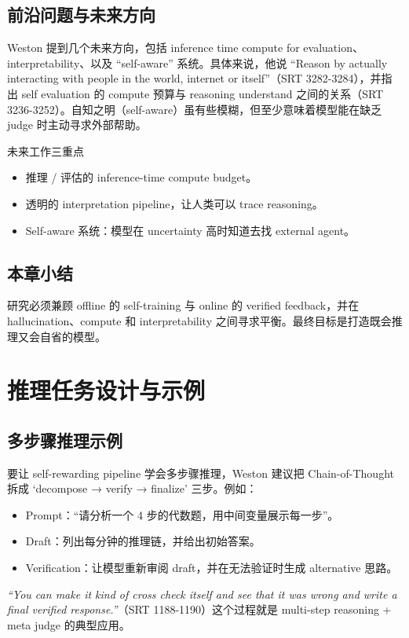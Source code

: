 \documentclass[a4paper]{article}
\begin{document}
\subsection{前沿问题与未来方向}
Weston 提到几个未来方向，包括 inference time compute for evaluation、interpretability、以及 ``self-aware'' 系统。具体来说，他说 ``Reason by actually interacting with people in the world, internet or itself''（SRT 3282-3284），并指出 self evaluation 的 compute 预算与 reasoning understand 之间的关系（SRT 3236-3252）。自知之明（self-aware）虽有些模糊，但至少意味着模型能在缺乏 judge 时主动寻求外部帮助。

\begin{importantbox}{未来工作三重点}
\begin{itemize}
    \item 推理 / 评估的 inference-time compute budget。
    \item 透明的 interpretation pipeline，让人类可以 trace reasoning。
    \item Self-aware 系统：模型在 uncertainty 高时知道去找 external agent。
\end{itemize}
\end{importantbox}

\subsection{本章小结}
研究必须兼顾 offline 的 self-training 与 online 的 verified feedback，并在 hallucination、compute 和 interpretability 之间寻求平衡。最终目标是打造既会推理又会自省的模型。

\section{推理任务设计与示例}
\subsection{多步骤推理示例}
要让 self-rewarding pipeline 学会多步骤推理，Weston 建议把 Chain-of-Thought 拆成 `decompose → verify → finalize' 三步。例如：
\begin{itemize}
    \item Prompt：``请分析一个 4 步的代数题，用中间变量展示每一步''。
    \item Draft：列出每分钟的推理链，并给出初始答案。
    \item Verification：让模型重新审阅 draft，并在无法验证时生成 alternative 思路。
\end{itemize}
\textit{``You can make it kind of cross check itself and see that it was wrong and write a final verified response.''}（SRT 1188-1190）这个过程就是 multi-step reasoning + meta judge 的典型应用。
\end{document}
